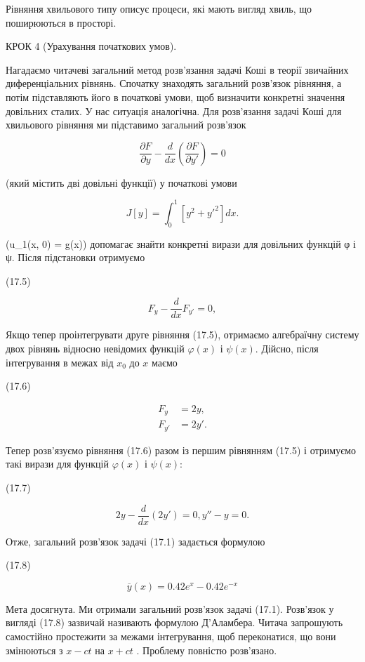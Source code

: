 \documentclass[
  ukrainian,
]{article}
\begin{document}
Рівняння хвильового типу описує процеси, які мають вигляд хвиль, що
поширюються в просторі.

КРОК 4 (Урахування початкових умов).

Нагадаємо читачеві загальний метод розв'язання задачі Коші в теорії
звичайних диференціальних рівнянь. Спочатку знаходять загальний
розв'язок рівняння, а потім підставляють його в початкові умови, щоб
визначити конкретні значення довільних сталих. У нас ситуація
аналогічна. Для розв'язання задачі Коші для хвильового рівняння ми
підставимо загальний розв'язок

\[
\frac{\partial F}{\partial y} - \frac{d}{dx}\!\left(\frac{\partial F}{\partial y'}\right) = 0
\]

(який містить дві довільні функції) у початкові умови

\[
J[y] = \int_{0}^{1} [y^{2} + y'^{2}] dx.
\]

(u\_1(x, 0) = g(x)) допомагає знайти конкретні вирази для довільних
функцій φ і ψ. Після підстановки отримуємо

(17.5)

\[
F_y - \frac{d}{dx} F_{y'} = 0,
\]

Якщо тепер проінтегрувати друге рівняння (17.5), отримаємо алгебраїчну
систему двох рівнянь відносно невідомих функцій \(\varphi(x)\) і
\(\psi(x)\). Дійсно, після інтегрування в межах від \(x_0\) до \(x\)
маємо

(17.6)

\[
\begin{aligned}
F_y &= 2y, \\
F_{y'} &= 2y'.
\end{aligned}
\]

Тепер розв'язуємо рівняння (17.6) разом із першим рівнянням (17.5) і
отримуємо такі вирази для функцій \(\varphi(x)\) і \(\psi(x)\):

(17.7)

\[
2y - \frac{d}{dx}(2y') = 0,
y'' - y = 0.
\]

Отже, загальний розв'язок задачі (17.1) задається формулою

(17.8)

\[
\overline{y}(x) = 0.42e^x - 0.42e^{-x}
\]

Мета досягнута. Ми отримали загальний розв'язок задачі (17.1). Розв'язок
у вигляді (17.8) зазвичай називають формулою Д'Аламбера. Читача
запрошують самостійно простежити за межами інтегрування, щоб
переконатися, що вони змінюються з \(x-ct\) на \(x+ct\) . Проблему
повністю розв'язано.
\end{document}
